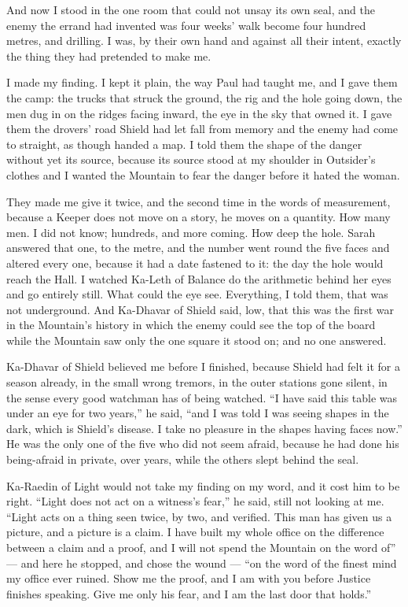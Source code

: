 And now I stood in the one room that could not unsay its own seal, and the enemy the errand had invented was four weeks' walk become four hundred metres, and drilling. I was, by their own hand and against all their intent, exactly the thing they had pretended to make me.\par

\ornament

I made my finding. I kept it plain, the way Paul had taught me, and I gave them the camp: the trucks that struck the ground, the rig and the hole going down, the men dug in on the ridges facing inward, the eye in the sky that owned it. I gave them the drovers' road Shield had let fall from memory and the enemy had come to straight, as though handed a map. I told them the shape of the danger without yet its source, because its source stood at my shoulder in Outsider's clothes and I wanted the Mountain to fear the danger before it hated the woman.\par

They made me give it twice, and the second time in the words of measurement, because a Keeper does not move on a story, he moves on a quantity. How many men. I did not know; hundreds, and more coming. How deep the hole. Sarah answered that one, to the metre, and the number went round the five faces and altered every one, because it had a date fastened to it: the day the hole would reach the Hall. I watched Ka-Leth of Balance do the arithmetic behind her eyes and go entirely still. What could the eye see. Everything, I told them, that was not underground. And Ka-Dhavar of Shield said, low, that this was the first war in the Mountain's history in which the enemy could see the top of the board while the Mountain saw only the one square it stood on; and no one answered.\par

Ka-Dhavar of Shield believed me before I finished, because Shield had felt it for a season already, in the small wrong tremors, in the outer stations gone silent, in the sense every good watchman has of being watched. ``I have said this table was under an eye for two years,'' he said, ``and I was told I was seeing shapes in the dark, which is Shield's disease. I take no pleasure in the shapes having faces now.'' He was the only one of the five who did not seem afraid, because he had done his being-afraid in private, over years, while the others slept behind the seal.\par

Ka-Raedin of Light would not take my finding on my word, and it cost him to be right. ``Light does not act on a witness's fear,'' he said, still not looking at me. ``Light acts on a thing seen twice, by two, and verified. This man has given us a picture, and a picture is a claim. I have built my whole office on the difference between a claim and a proof, and I will not spend the Mountain on the word of'' --- and here he stopped, and chose the wound --- ``on the word of the finest mind my office ever ruined. Show me the proof, and I am with you before Justice finishes speaking. Give me only his fear, and I am the last door that holds.''\par

